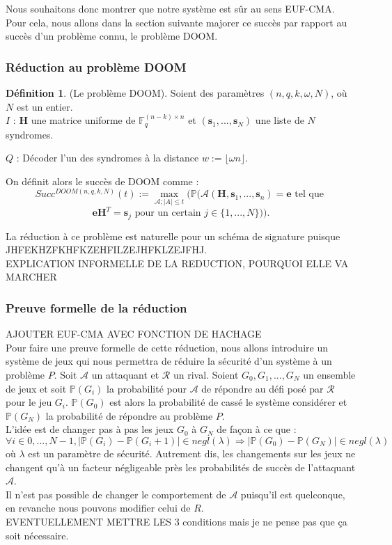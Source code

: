 \documentclass[12pt]{article}
\theoremstyle{definition}
\newtheorem{defi}[thm]{Définition}
\newcommand{\F}{\mathbb{F}}
\begin{document}
Nous souhaitons donc montrer que notre système est sûr au sens EUF-CMA. Pour cela, nous allons dans la section suivante majorer ce succès par rapport au succès d'un problème connu, le problème DOOM.


\subsubsection{Réduction au problème DOOM}
\begin{defi} (Le problème DOOM). Soient des paramètres $(n,q,k,\omega,N)$, où $N$ est un entier. \\

\leftskip=1cm
\noindent$I$ : $\mathbf{H}$ une matrice uniforme de $\F_q^{(n-k)\times n}$ et $(\mathbf{s}_1,...,\mathbf{s}_N)$ une liste de $N$ syndromes. 

\noindent$Q$ : Décoder l'un des syndromes à la distance $w := \lfloor \omega n \rfloor$. 

\leftskip=0cm

On définit alors le succès de DOOM comme :
$$Succ^{DOOM(n,q,k,N)}(t) := \max_{\mathcal{A};|A|\leq t}(\mathbb{P}(\mathcal{A}(\mathbf{H},\mathbf{s}_1,...,\mathbf{s}_n)=\mathbf{e}\text{ tel que }$$
$$ \mathbf{eH}^T = \mathbf{s}_j \text{ pour un certain } j \in \{1,...,N\})).$$
\end{defi} 

La réduction à ce problème est naturelle pour un schéma de signature puisque JHFEKHZFKHFKZEHFILZEJHFKLZEJFHJ. \\ 
EXPLICATION INFORMELLE DE LA REDUCTION, POURQUOI ELLE VA MARCHER \\


\subsubsection{Preuve formelle de la réduction}
AJOUTER EUF-CMA AVEC FONCTION DE HACHAGE \\
Pour faire une preuve formelle de cette réduction, nous allons introduire un système de jeux qui nous permettra de réduire la sécurité d'un système à un problème $P$. Soit $\mathcal{A}$ un attaquant et $\mathcal{R}$ un rival. Soient $G_0, G_1, ...,G_N$ un ensemble de jeux et soit $\mathbb{P}(G_i)$ la probabilité pour $\mathcal{A}$ de répondre au défi posé par $\mathcal{R}$ pour le jeu $G_i$. $\mathbb{P}(G_0)$ est alors la probabilité de cassé le système considérer et $\mathbb{P}(G_N)$ la probabilité de répondre au problème $P$. \\
L'idée est de changer pas à pas les jeux $G_0$ à $G_N$ de façon à ce que :
$$\forall i \in {0,...,N-1}, |\mathbb{P}(G_i)-\mathbb{P}(G_i+1)| \in negl(\lambda) \Longrightarrow |\mathbb{P}(G_0)-\mathbb{P}(G_N)|  \in negl(\lambda)$$
où $\lambda$ est un paramètre de sécurité. Autrement dis, les changements sur les jeux ne changent qu'à un facteur négligeable près les probabilités de succès de l'attaquant $\mathcal{A}$. \\
Il n'est pas possible de changer le comportement de $\mathcal{A}$ puisqu'il est quelconque, en revanche nous pouvons modifier celui de $R$. \\
EVENTUELLEMENT METTRE LES 3 conditions mais je ne pense pas que ça soit nécessaire. \\
\end{document}
